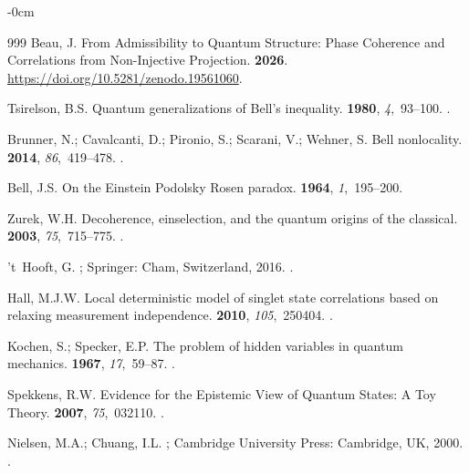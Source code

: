 \documentclass[quantumrep,article,accept,pdftex,oneauthor]{Definitions/mdpi}
\theoremstyle{remark}
\begin{document}
\begin{adjustwidth}{-\extralength}{0cm}
\begin{thebibliography}{999}
Beau, J.
\newblock From Admissibility to Quantum Structure: Phase Coherence and
  Correlations from Non-Injective Projection.
 {\bf 2026}.
  \newblock
  {\url{https://doi.org/10.5281/zenodo.19561060}}.

Tsirelson, B.S.
\newblock Quantum generalizations of {Bell}'s inequality.
 {\bf 1980}, {\em 4},~93--100.
.

Brunner, N.; Cavalcanti, D.; Pironio, S.; Scarani, V.; Wehner, S.
\newblock Bell nonlocality.
 {\bf 2014}, {\em 86},~419--478.
.

Bell, J.S.
\newblock On the Einstein Podolsky Rosen paradox.
 {\bf 1964}, {\em 1},~195--200.

Zurek, W.H.
\newblock Decoherence, einselection, and the quantum origins of the classical.
 {\bf 2003}, {\em 75},~715--775.
.

't~Hooft, G.
; Springer: Cham, Switzerland,
  2016.
.

Hall, M.J.W.
\newblock Local deterministic model of singlet state correlations based on
  relaxing measurement independence.
 {\bf 2010}, {\em 105},~250404.
.

Kochen, S.; Specker, E.P.
\newblock The problem of hidden variables in quantum mechanics.
 {\bf 1967}, {\em
  17},~59--87.
.

Spekkens, R.W.
\newblock Evidence for the Epistemic View of Quantum States: A Toy Theory.
 {\bf 2007}, {\em 75},~032110.
.

Nielsen, M.A.; Chuang, I.L.
; Cambridge
  University Press: Cambridge, UK, 2000.
.

\end{thebibliography}
\PublishersNote{}
\end{adjustwidth}
\end{document}
